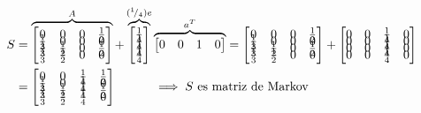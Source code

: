 \begin{align*}
    S &=
        \overbrace{
            \begin{bmatrix}
                    0& 0& 0& \frac{1}{2}\\[-0.65em]
                    \frac{1}{3}& 0& 0& 0\\[-0.65em]
                    \frac{1}{3}& \frac{1}{2}& 0& \frac{1}{2}\\[-0.65em]
                    \frac{1}{3}& \frac{1}{2}& 0& 0
            \end{bmatrix}
        }^A
    +
        \overbrace{
            \begin{bmatrix}
                \frac{1}{4}\\[-0.65em]
                \frac{1}{4}\\[-0.65em]
                \frac{1}{4}\\[-0.65em]
                \frac{1}{4}
            \end{bmatrix}
        }^{({}^{1}\!/_{4})e}
        \overbrace{
            \begin{bmatrix}
                0 & 0 & 1 & 0
            \end{bmatrix}
        }^{a^T}
    =
        \begin{bmatrix}
                0& 0& 0& \frac{1}{2}\\[-0.65em]
                \frac{1}{3}& 0& 0& 0\\[-0.65em]
                \frac{1}{3}& \frac{1}{2}& 0& \frac{1}{2}\\[-0.65em]
                \frac{1}{3}& \frac{1}{2}& 0& 0
        \end{bmatrix}
        +
        \begin{bmatrix}
            0&0&\frac{1}{4}&0\\[-0.65em]
            0&0&\frac{1}{4}&0\\[-0.65em]
            0&0&\frac{1}{4}&0\\[-0.65em]
            0&0&\frac{1}{4}&0
        \end{bmatrix}\\
    &=
        \begin{bmatrix}
            0& 0& \frac{1}{4}& \frac{1}{2}\\[-0.65em]
            \frac{1}{3}& 0& \frac{1}{4}& 0\\[-0.65em]
            \frac{1}{3}& \frac{1}{2}& \frac{1}{4}& \frac{1}{2}\\[-0.65em]
            \frac{1}{3}& \frac{1}{2}& \frac{1}{4}& 0
        \end{bmatrix}
    \quad\quad\quad\implies\text{$S$ es matriz de Markov}
\end{align*}

